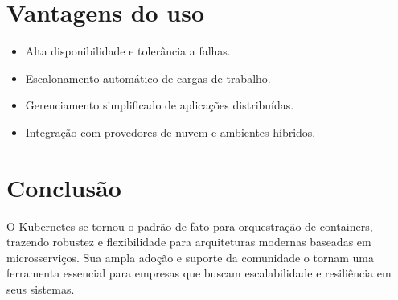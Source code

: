 \documentclass{abntex2}
\begin{document}
\section{Vantagens do uso}
\begin{itemize}
    \item Alta disponibilidade e tolerância a falhas.
    \item Escalonamento automático de cargas de trabalho.
    \item Gerenciamento simplificado de aplicações distribuídas.
    \item Integração com provedores de nuvem e ambientes híbridos.
\end{itemize}

\section{Conclusão}
O Kubernetes se tornou o padrão de fato para orquestração de containers, trazendo robustez e flexibilidade para arquiteturas modernas baseadas em microsserviços. 
Sua ampla adoção e suporte da comunidade o tornam uma ferramenta essencial para empresas que buscam escalabilidade e resiliência em seus sistemas.
\end{document}
